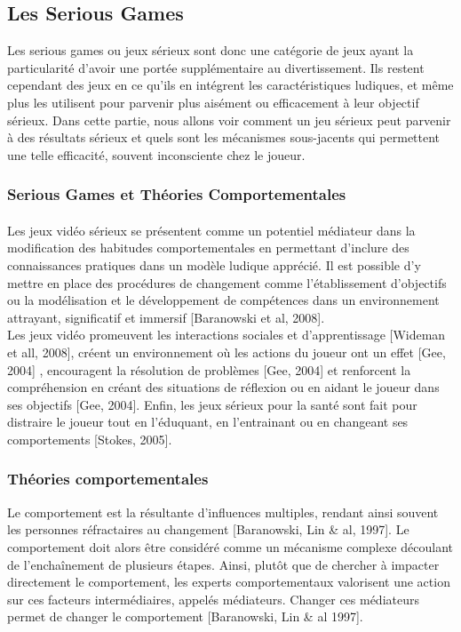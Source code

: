 \subsection{Les Serious Games}
Les serious games ou jeux sérieux sont donc une catégorie de jeux ayant la particularité d'avoir une portée supplémentaire au divertissement. Ils restent cependant des jeux en ce qu'ils en intégrent les caractéristiques ludiques, et même plus les utilisent pour parvenir plus aisément ou efficacement à leur objectif sérieux. Dans cette partie, nous allons voir comment un jeu sérieux  peut parvenir à des résultats sérieux et quels sont les mécanismes sous-jacents qui permettent une telle efficacité, souvent inconsciente chez le joueur.
	\subsubsection{Serious Games et Théories Comportementales }
			\paragraph{}
Les jeux vidéo sérieux se présentent comme un potentiel médiateur dans la modification des habitudes comportementales en permettant d’inclure des connaissances pratiques dans un modèle ludique apprécié. Il est possible d’y mettre en place des procédures de changement comme l’établissement d’objectifs ou la modélisation et le développement de compétences dans un environnement attrayant, significatif et immersif [Baranowski et al, 2008]. \\
Les jeux vidéo promeuvent les interactions sociales et d’apprentissage [Wideman et all, 2008], créent un environnement où les actions du joueur ont un effet [Gee, 2004] , encouragent la résolution de problèmes [Gee, 2004] et renforcent la compréhension en créant des situations de réflexion ou en aidant le joueur dans ses objectifs [Gee, 2004]. Enfin, les jeux sérieux pour la santé sont fait pour distraire le joueur tout en l’éduquant, en l’entrainant ou en changeant ses comportements [Stokes, 2005].

		\subsubsection*{Théories comportementales}
Le comportement est la résultante d’influences multiples, rendant ainsi souvent les personnes réfractaires au changement [Baranowski, Lin \& al, 1997]. Le comportement doit alors être considéré comme un mécanisme complexe découlant de l’enchaînement de plusieurs étapes. Ainsi, plutôt que de chercher à impacter directement le comportement, les experts comportementaux valorisent une action sur ces facteurs intermédiaires, appelés médiateurs. Changer ces médiateurs permet de changer le comportement [Baranowski, Lin \& al 1997].

